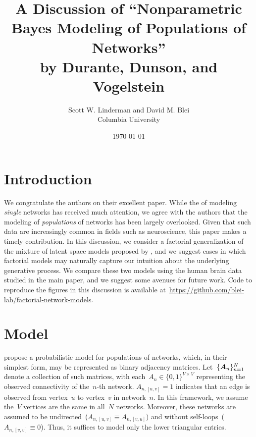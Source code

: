 



\title{A Discussion of ``Nonparametric Bayes Modeling of Populations of Networks''\\
by Durante, Dunson, and Vogelstein}
\author{
  Scott W. Linderman and David M. Blei\\
  Columbia University
}
\date{\today}


\maketitle


\section{Introduction}

We congratulate the authors on their excellent paper.  While the of
modeling \emph{single} networks has received much attention, we agree
with the authors that the modeling of \emph{populations} of
networks has been largely overlooked.  Given that such data are
increasingly common in fields such as neuroscience, this paper makes a
timely contribution.  In this discussion, we consider a factorial
generalization of the mixture of latent space models proposed by
\citet{durante2016nonparametric}, and we suggest cases in which factorial
models may naturally capture our intuition about the
underlying generative process. We compare these two models using the
human brain data studied in the main paper, and we suggest some
avenues for future work.  Code to reproduce the figures in this
discussion is available
at~\url{https://github.com/blei-lab/factorial-network-models}.

\section{Model}
\citet{durante2016nonparametric} propose a probabilistic model for
populations of networks, which, in their simplest form, may be
represented as binary adjacency matrices.  Let~$\{\boldsymbol{A}_n\}_{n=1}^N$
denote a collection of such matrices, with
each~${A_n \in \{0,1\}^{V \times V}}$ representing the observed
connectivity of the~$n$-th network.  ${A_{n,[u,v]}=1}$ indicates that
an edge is observed from vertex~$u$ to vertex~$v$ in network~$n$.  In
this framework, we assume the~$V$ vertices are the same in all~$N$
networks.  Moreover, these networks are assumed to be
undirected~(${A_{n,[u,v]} \equiv A_{n,[v,u]}}$) and without
self-loops~(${A_{n,[v,v]} \equiv 0}$). Thus, it suffices to model only
the lower triangular entries.


